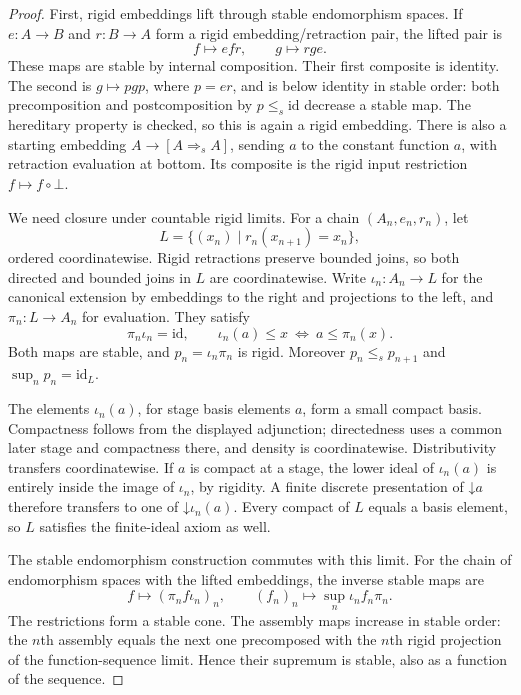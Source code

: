 \documentclass[11pt]{article}
\newcommand{\id}{\mathrm{id}}
\begin{document}
\begin{proof}
First, rigid embeddings lift through stable endomorphism spaces. If
$e:A\to B$ and $r:B\to A$ form a rigid embedding/retraction pair, the
lifted pair is
\[
 f\longmapsto efr,\qquad g\longmapsto rge.
\]
These maps are stable by internal composition. Their first composite is
identity. The second is $g\mapsto pgp$, where $p=er$, and is below
identity in stable order: both precomposition and postcomposition by
$p\le_s\id$ decrease a stable map. The hereditary property is checked,
so this is again a rigid embedding. There is also a starting embedding
$A\to[A\Rightarrow_s A]$, sending $a$ to the constant function $a$,
with retraction evaluation at bottom. Its composite is the rigid input
restriction $f\mapsto f\circ\bot$.

We need closure under countable rigid limits. For a chain
$(A_n,e_n,r_n)$, let
\[
 L=\{(x_n)\mid r_n(x_{n+1})=x_n\},
\]
ordered coordinatewise. Rigid retractions preserve bounded joins, so
both directed and bounded joins in $L$ are coordinatewise. Write
$\iota_n:A_n\to L$ for the canonical extension by embeddings to the
right and projections to the left, and $\pi_n:L\to A_n$ for evaluation.
They satisfy
\[
 \pi_n\iota_n=\id,\qquad
 \iota_n(a)\le x\ \Longleftrightarrow\ a\le\pi_n(x).
\]
Both maps are stable, and $p_n=\iota_n\pi_n$ is rigid. Moreover
$p_n\le_s p_{n+1}$ and $\sup_n p_n=\id_L$.

The elements $\iota_n(a)$, for stage basis elements $a$, form a small
compact basis. Compactness follows from the displayed adjunction;
directedness uses a common later stage and compactness there, and
density is coordinatewise. Distributivity transfers coordinatewise.
If $a$ is compact at a stage, the lower ideal of $\iota_n(a)$ is entirely
inside the image of $\iota_n$, by rigidity. A finite discrete
presentation of $\mathord\downarrow a$ therefore transfers to one of
$\mathord\downarrow\iota_n(a)$. Every compact of $L$ equals a basis
element, so $L$ satisfies the finite-ideal axiom as well.

The stable endomorphism construction commutes with this limit. For the
chain of endomorphism spaces with the lifted embeddings, the inverse
stable maps are
\[
 f\longmapsto(\pi_n f\iota_n)_n,
 \qquad
 (f_n)_n\longmapsto\sup_n\iota_n f_n\pi_n.
\]
The restrictions form a stable cone. The assembly maps increase in
stable order: the $n$th assembly equals the next one precomposed with
the $n$th rigid projection of the function-sequence limit. Hence their
supremum is stable, also as a function of the sequence.


\end{proof}
\end{document}
